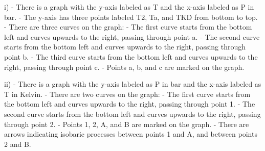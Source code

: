 i) 
- There is a graph with the y-axis labeled as T and the x-axis labeled as P in bar.
- The y-axis has three points labeled T2, Ta, and TKD from bottom to top.
- There are three curves on the graph:
  - The first curve starts from the bottom left and curves upwards to the right, passing through point a.
  - The second curve starts from the bottom left and curves upwards to the right, passing through point b.
  - The third curve starts from the bottom left and curves upwards to the right, passing through point c.
- Points a, b, and c are marked on the graph.

ii)
- There is a graph with the y-axis labeled as P in bar and the x-axis labeled as T in Kelvin.
- There are two curves on the graph:
  - The first curve starts from the bottom left and curves upwards to the right, passing through point 1.
  - The second curve starts from the bottom left and curves upwards to the right, passing through point 2.
- Points 1, 2, A, and B are marked on the graph.
- There are arrows indicating isobaric processes between points 1 and A, and between points 2 and B.